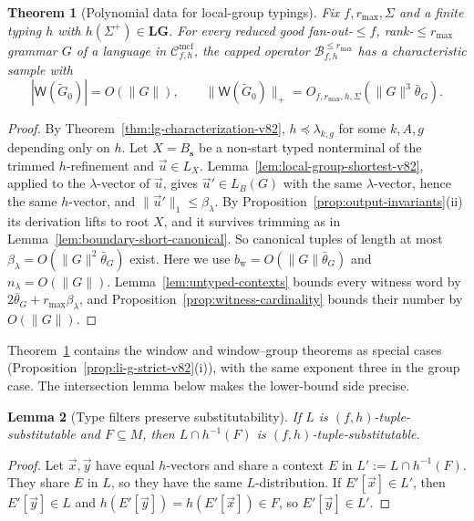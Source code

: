 \documentclass[11pt]{article}
\numberwithin{equation}{section}
\theoremstyle{plain}
\newtheorem{theorem}{Theorem}[section]
\newtheorem{lemma}[theorem]{Lemma}
\theoremstyle{definition}
\theoremstyle{remark}
\newcommand{\Wit}{\mathsf{W}}
\newcommand{\Cmcf}[2]{\mathcal{C}^{\mathrm{mcf}}_{#1,#2}}
\newcommand{\tuple}[1]{\vec{#1}}
\theoremstyle{plain}
\begin{document}
\begin{theorem}[Polynomial data for local-group typings]
\label{thm:local-group-polydata-v82}
Fix $f,r_{\max},\Sigma$ and a finite typing $h$ with
$h(\Sigma^+)\in\mathbf{LG}$.  For every reduced good fan-out-$\le f$,
rank-$\le r_{\max}$ grammar $G$ of a language in $\Cmcf{f}{h}$, the
capped operator $\mathcal B^{\le r_{\max}}_{f,h}$ has a characteristic
sample with
\[
 |\Wit(\widetilde G_0)|=O(\|G\|),\qquad
 \|\Wit(\widetilde G_0)\|_+=O_{f,r_{\max},h,\Sigma}(\|G\|^3\bar\theta_G).
\]
\end{theorem}

\begin{proof}
By Theorem~\ref{thm:lg-characterization-v82}, $h\preceq\lambda_{k,g}$ for
some $k,A,g$ depending only on $h$.  Let $X=B_{\mathbf s}$ be a
non-start typed nonterminal of the trimmed $h$-refinement and
$\tuple u\in L_X$.  Lemma~\ref{lem:local-group-shortest-v82}, applied to
the $\lambda$-vector of $\tuple u$, gives $\tuple u'\in L_B(G)$ with
the same $\lambda$-vector, hence the same $h$-vector, and
$\|\tuple u'\|_1\le\beta_\lambda$.  By
Proposition~\ref{prop:output-invariants}(ii) its derivation lifts to
root $X$, and it survives trimming as in
Lemma~\ref{lem:boundary-short-canonical}.  So canonical tuples of
length at most $\beta_\lambda=O(\|G\|^2\bar\theta_G)$ exist.  Here we
use $b_{\mathrm w}=O(\|G\|\bar\theta_G)$ and $n_\lambda=O(\|G\|)$.
Lemma~\ref{lem:untyped-contexts} bounds every witness word by
$2\bar\theta_G+r_{\max}\beta_\lambda$, and
Proposition~\ref{prop:witness-cardinality} bounds their number by
$O(\|G\|)$.
\end{proof}

Theorem~\ref{thm:local-group-polydata-v82} contains the window and
window--group theorems as special cases
(Proposition~\ref{prop:li-g-strict-v82}(i)), with the same exponent three
in the group case.  The intersection lemma below makes the
lower-bound side precise.

\begin{lemma}[Type filters preserve substitutability]
\label{lem:type-filter}
If $L$ is $(f,h)$-tuple-substitutable and $F\subseteq M$, then
$L\cap h^{-1}(F)$ is $(f,h)$-tuple-substitutable.
\end{lemma}

\begin{proof}
Let $\tuple x,\tuple y$ have equal $h$-vectors and share a context $E$
in $L':=L\cap h^{-1}(F)$.  They share $E$ in $L$, so they have the same
$L$-distribution.  If $E'[\tuple x]\in L'$, then $E'[\tuple y]\in L$
and $h(E'[\tuple y])=h(E'[\tuple x])\in F$, so $E'[\tuple y]\in L'$.
\end{proof}
\end{document}
